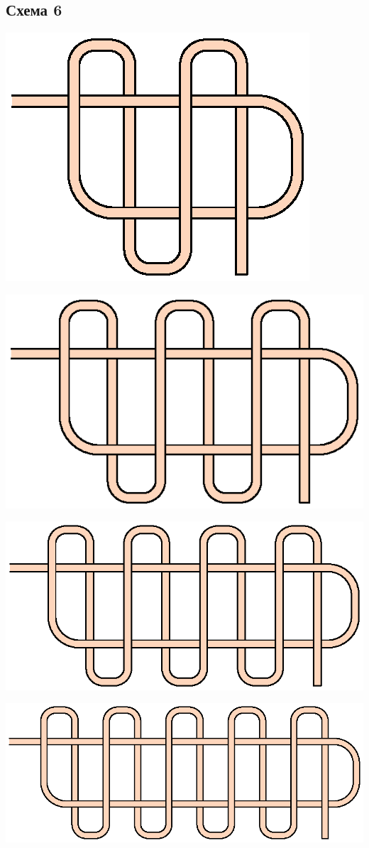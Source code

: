 \subsection{Схема 6}
\graphicspath{{\currentpath}}

\includegraphics{images/s-06-a1.eps}

\includegraphics{images/s-06-a2.eps}

\includegraphics{images/s-06-a3.eps}

\includegraphics{images/s-06-a4.eps}